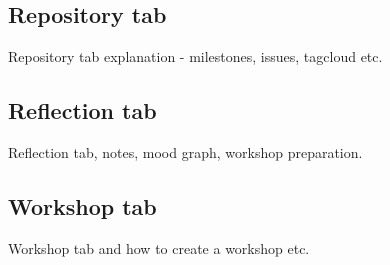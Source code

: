 \subsection{Repository tab}
Repository tab explanation - milestones, issues, tagcloud etc.
\subsection{Reflection tab}
Reflection tab, notes, mood graph, workshop preparation.
\subsection{Workshop tab}
Workshop tab and how to create a workshop etc. 


